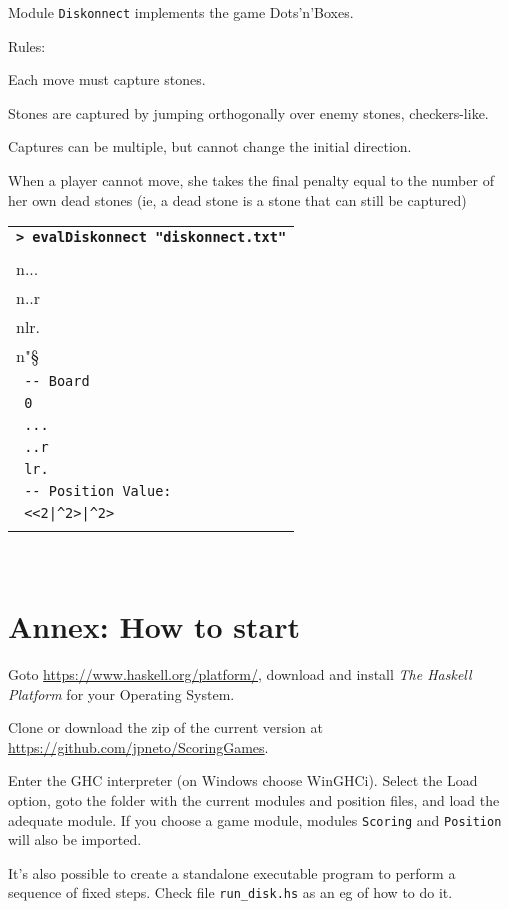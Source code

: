 \documentclass[a4paper,12pt]{article}
\newcommand{\bash}[1]{\small\textbf{\lstinline§> #1§}\\}
\newcommand{\out}[1]{\small\lstinline§ #1§}
\newcommand{\haskellCode}{\fontfamily{pcr}\selectfont}
\newenvironment{sgcode}
	{ \haskellCode
	  \begin{tabular}{|p{0.9\textwidth}|}
      \hline	
	}
	{ \\\hline  
      \end{tabular} \\
	  \par 
	}
\begin{document}
Module \verb|Diskonnect| implements the game Dots'n'Boxes.

Rules:

Each move must capture stones.

Stones are captured by jumping orthogonally over enemy stones, checkers-like.

Captures can be multiple, but cannot change the initial direction.

When a player cannot move, she takes the final penalty equal to the number
of her own dead stones (ie, a dead stone is a stone that can still be captured)

\begin{sgcode}
\bash{evalDiskonnect "diskonnect.txt"}
\out{-- Read: "0\\n...\\n..r\\nlr.\\n"} \\
\out{-- Board} \\
\out{0} \\
\out{...} \\
\out{..r} \\
\out{lr.} \\
\out{-- Position Value:} \\
\out{<<2|^2>|^2>} \\
\end{sgcode}

\newpage \section{Annex: How to start}

Goto \url{https://www.haskell.org/platform/}, download and install \textit{The Haskell Platform} 
for your Operating System. 

Clone or download the zip of the current version at \url{https://github.com/jpneto/ScoringGames}.

Enter the GHC interpreter (on Windows choose WinGHCi). Select the Load option, goto the folder with the current modules and position files, and load the adequate module. If you choose a game module, modules \verb!Scoring! and \verb!Position! will also be imported.

It's also possible to create a standalone executable program to perform a sequence of fixed steps. Check file \verb!run_disk.hs! as an eg of how to do it.
\end{document}
